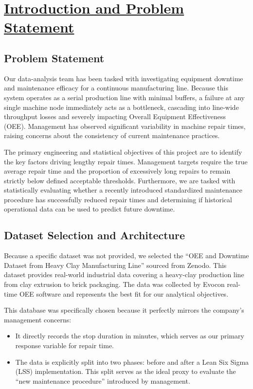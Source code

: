\section*{\underline{Introduction and Problem Statement}}

\subsection{Problem Statement}
Our data-analysis team has been tasked with investigating equipment downtime and maintenance efficacy for a continuous manufacturing line. Because this system operates as a serial production line with minimal buffers, a failure at any single machine node immediately acts as a bottleneck, cascading into line-wide throughput losses and severely impacting Overall Equipment Effectiveness (OEE). Management has observed significant variability in machine repair times, raising concerns about the consistency of current maintenance practices.

The primary engineering and statistical objectives of this project are to identify the key factors driving lengthy repair times. Management targets require the true average repair time and the proportion of excessively long repairs to remain strictly below defined acceptable thresholds. Furthermore, we are tasked with statistically evaluating whether a recently introduced standardized maintenance procedure has successfully reduced repair times and determining if historical operational data can be used to predict future downtime.

\subsection{Dataset Selection and Architecture}
Because a specific dataset was not provided, we selected the ``OEE and Downtime Dataset from Heavy Clay Manufacturing Line'' sourced from Zenodo. This dataset provides real-world industrial data covering a heavy-clay production line from clay extrusion to brick packaging. The data was collected by Evocon real-time OEE software and represents the best fit for our analytical objectives. 

This database was specifically chosen because it perfectly mirrors the company's management concerns:
\begin{itemize}
    \item It directly records the stop duration in minutes, which serves as our primary response variable for repair time.
    \item The data is explicitly split into two phases: before and after a Lean Six Sigma (LSS) implementation. This split serves as the ideal proxy to evaluate the ``new maintenance procedure'' introduced by management.
\end{itemize}

